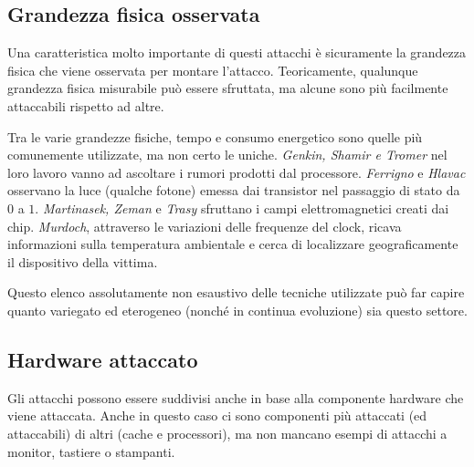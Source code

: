 		\subsection*{Grandezza fisica osservata}		
			Una caratteristica molto importante di questi attacchi è sicuramente la grandezza fisica che viene osservata per montare l'attacco. Teoricamente, qualunque grandezza fisica misurabile può essere sfruttata, ma alcune sono più facilmente attaccabili rispetto ad altre. 
			
			Tra le varie grandezze fisiche, tempo e consumo energetico sono quelle più comunemente utilizzate, ma non certo le uniche. \emph{Genkin, Shamir e Tromer} nel loro lavoro \cite{genkin2014rsa} vanno ad ascoltare i rumori prodotti dal processore. \emph{Ferrigno} e \emph{Hlavac}\cite{ferrigno2008aes} osservano la luce (qualche fotone) emessa dai transistor nel passaggio di stato da $0$ a $1$. \emph{Martinasek, Zeman} e \emph{Trasy}\cite{martinasek2012simple} sfruttano i campi elettromagnetici creati dai chip. \emph{Murdoch}, attraverso le variazioni delle frequenze del clock, ricava informazioni sulla temperatura ambientale e cerca di localizzare geograficamente il dispositivo della vittima.
			
			Questo elenco assolutamente non esaustivo delle tecniche utilizzate può far capire quanto variegato ed eterogeneo (nonché in continua evoluzione) sia questo settore.
			
		\subsection*{Hardware attaccato}		
			Gli attacchi possono essere suddivisi anche in base alla componente hardware che viene attaccata. Anche in questo caso ci sono componenti più attaccati (ed attaccabili) di altri (cache e processori), ma non mancano esempi di attacchi a monitor\cite{van1985electromagn}, tastiere\cite{asonov2004keyboard} o stampanti\cite{backes2010acoustic}.
			
